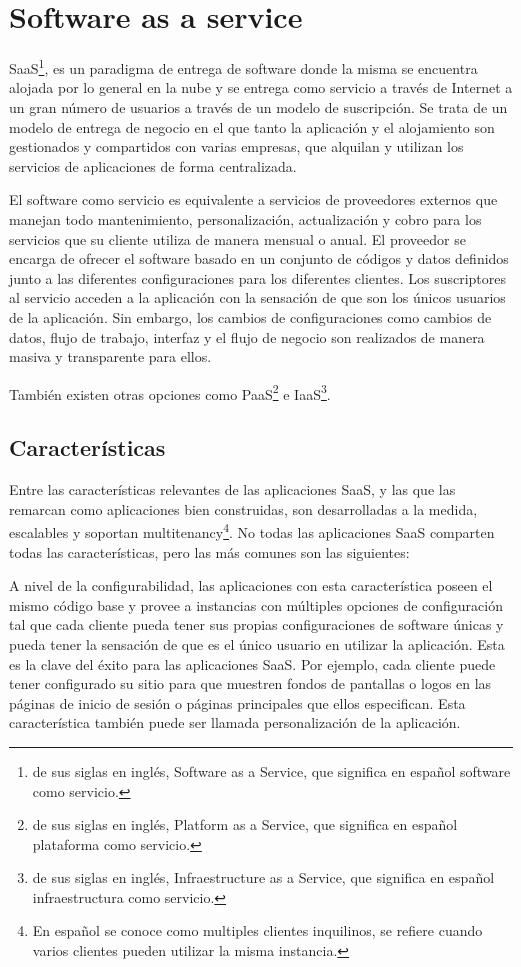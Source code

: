 \section{Software as a service}
SaaS\footnote{de sus siglas en inglés, Software as a Service, que significa en español software como servicio.}, es un paradigma de entrega de software donde la misma se encuentra alojada por lo general en la nube y se entrega como servicio a través de Internet a un gran número de usuarios a través de un modelo de suscripción. Se trata de un modelo de entrega de negocio en el que tanto la aplicación y el alojamiento son gestionados y compartidos con varias empresas, que alquilan y utilizan los servicios de aplicaciones de forma centralizada\citep{gupta_software_2014}.

El software como servicio es equivalente a servicios de proveedores externos que manejan todo mantenimiento, personalización, actualización y cobro para los servicios que su cliente utiliza de manera mensual o anual. El proveedor se encarga de ofrecer el software basado en un conjunto de códigos y datos definidos junto a las diferentes configuraciones para los diferentes clientes. Los suscriptores al servicio acceden a la aplicación con la sensación de que son los únicos usuarios de la aplicación. Sin embargo, los cambios de configuraciones como cambios de datos, flujo de trabajo, interfaz y el flujo de negocio son realizados de manera masiva y transparente para ellos\citep{kumar_cloud_2012}\citep{kang_web_2012}.

También existen otras opciones como PaaS\footnote{de sus siglas en inglés, Platform as a Service, que significa en español plataforma como servicio.} e IaaS\footnote{de sus siglas en inglés, Infraestructure as a Service, que significa en español infraestructura como servicio.}.

\subsection{Características}
Entre las características relevantes de las aplicaciones SaaS, y las que las remarcan como aplicaciones bien construidas, son desarrolladas a la medida, escalables y soportan multitenancy\footnote{En español se conoce como multiples clientes inquilinos, se refiere cuando varios clientes pueden utilizar la misma instancia.}. No todas las aplicaciones SaaS comparten todas las características, pero las más comunes son las siguientes: 

A nivel de la configurabilidad, las aplicaciones con esta característica poseen el mismo código base y provee a instancias con múltiples opciones de configuración tal que cada cliente pueda tener sus propias configuraciones de software únicas y pueda tener la sensación de que es el único usuario en utilizar la aplicación. Esta es la clave del éxito para las aplicaciones SaaS\citep{jadeja2012cloud}. Por ejemplo, cada cliente puede tener configurado su sitio para que muestren fondos de pantallas o logos en las páginas de inicio de sesión o páginas principales que ellos especifican. Esta característica también puede ser llamada personalización de la aplicación.


